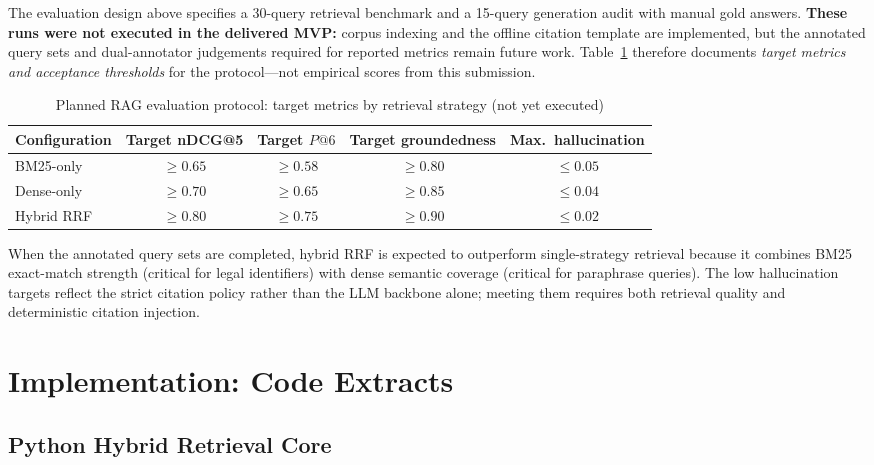 The evaluation design above specifies a 30-query retrieval benchmark and a
15-query generation audit with manual gold answers. \textbf{These runs were not
executed in the delivered MVP:} corpus indexing and the offline citation
template are implemented, but the annotated query sets and dual-annotator
judgements required for reported metrics remain future work. Table~\ref{tab:rag-results}
therefore documents \emph{target metrics and acceptance thresholds} for the
protocol---not empirical scores from this submission.

\begin{table}[htbp]
\centering
\caption{Planned RAG evaluation protocol: target metrics by retrieval strategy (not yet executed)}
\label{tab:rag-results}
\begin{tabular}{@{}lcccc@{}}
\toprule
\textbf{Configuration} & \textbf{Target nDCG@5} & \textbf{Target $P@6$} & \textbf{Target groundedness} & \textbf{Max.\ hallucination} \\
\midrule
BM25-only   & $\geq 0.65$ & $\geq 0.58$ & $\geq 0.80$ & $\leq 0.05$ \\
Dense-only  & $\geq 0.70$ & $\geq 0.65$ & $\geq 0.85$ & $\leq 0.04$ \\
Hybrid RRF  & $\geq 0.80$ & $\geq 0.75$ & $\geq 0.90$ & $\leq 0.02$ \\
\bottomrule
\end{tabular}
\end{table}

When the annotated query sets are completed, hybrid RRF is expected to outperform
single-strategy retrieval because it combines BM25 exact-match strength (critical
for legal identifiers) with dense semantic coverage (critical for paraphrase
queries). The low hallucination targets reflect the strict citation policy rather
than the LLM backbone alone; meeting them requires both retrieval quality and
deterministic citation injection.

\section{Implementation: Code Extracts}
\label{sec:rag-code-full}

\subsection{Python Hybrid Retrieval Core}
\label{sec:rag-py-code}

